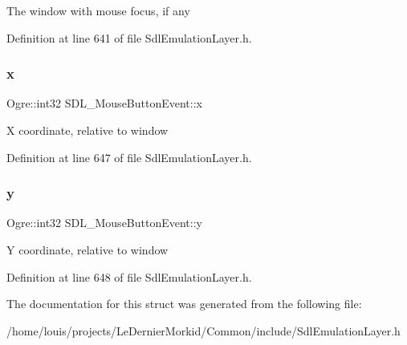 The window with mouse focus, if any 

Definition at line 641 of file Sdl\+Emulation\+Layer.\+h.

\mbox{\label{struct_s_d_l___mouse_button_event_aeb46064b59c44d7432356d9323e6c877}} 
\subsubsection{\texorpdfstring{x}{x}}
{\footnotesize\ttfamily Ogre\+::int32 S\+D\+L\+\_\+\+Mouse\+Button\+Event\+::x}

X coordinate, relative to window 

Definition at line 647 of file Sdl\+Emulation\+Layer.\+h.

\mbox{\label{struct_s_d_l___mouse_button_event_a811a7cc2e78a8740efed1bc6bb316819}} 
\subsubsection{\texorpdfstring{y}{y}}
{\footnotesize\ttfamily Ogre\+::int32 S\+D\+L\+\_\+\+Mouse\+Button\+Event\+::y}

Y coordinate, relative to window 

Definition at line 648 of file Sdl\+Emulation\+Layer.\+h.



The documentation for this struct was generated from the following file\+:\begin{DoxyCompactItemize}
\item 
/home/louis/projects/\+Le\+Dernier\+Morkid/\+Common/include/Sdl\+Emulation\+Layer.\+h\end{DoxyCompactItemize}
